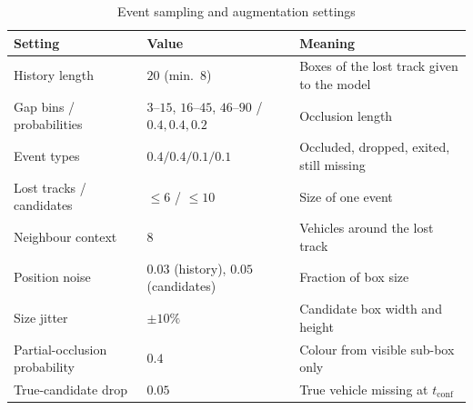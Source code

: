 \begin{table}[H]
    \centering
    \caption{Event sampling and augmentation settings}
    \label{tab:event_cfg}
    \begin{tabularx}{\textwidth}{l l X}
        \toprule
        \textbf{Setting} & \textbf{Value} & \textbf{Meaning} \\
        \midrule
        History length & $20$ (min.\ $8$) & Boxes of the lost track given to the model \\
        Gap bins / probabilities & $3$--$15$, $16$--$45$, $46$--$90$ / $0.4, 0.4, 0.2$ & Occlusion length \\
        Event types & $0.4 / 0.4 / 0.1 / 0.1$ & Occluded, dropped, exited, still missing \\
        Lost tracks / candidates & $\le 6$ / $\le 10$ & Size of one event \\
        Neighbour context & $8$ & Vehicles around the lost track \\
        Position noise & $0.03$ (history), $0.05$ (candidates) & Fraction of box size \\
        Size jitter & $\pm 10\%$ & Candidate box width and height \\
        Partial-occlusion probability & $0.4$ & Colour from visible sub-box only \\
        True-candidate drop & $0.05$ & True vehicle missing at $t_{\text{conf}}$ \\
        \bottomrule
    \end{tabularx}
\end{table}

